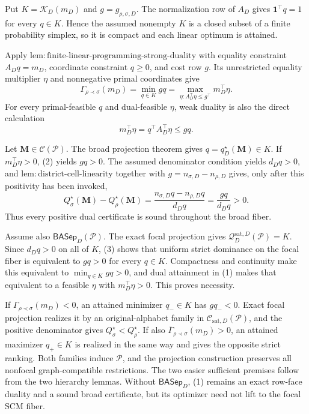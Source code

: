 Put \(K=\mathcal K_D(m_D)\) and \(g=g_{\rho,\sigma,D}\).  The normalization row of \(A_D\) gives \(\mathbf 1^\top q=1\) for every \(q\in K\).  Hence the assumed nonempty \(K\) is a closed subset of a finite probability simplex, so it is compact and each linear optimum is attained.

Apply \(\mathrm{lem:finite\text{-}linear\text{-}programming\text{-}strong\text{-}duality}\) with equality constraint \(A_Dq=m_D\), coordinate constraint \(q\geq0\), and cost row \(g\).  Its unrestricted equality multiplier \(\eta\) and nonnegative primal coordinates give
\[
\Gamma_{\rho\prec\sigma}(m_D)
=\min_{q\in K}gq
=\max_{\eta:A_D^\top\eta\le g^\top}m_D^\top\eta.
\tag{1}
\]
For every primal-feasible \(q\) and dual-feasible \(\eta\), weak duality is also the direct calculation
\[
m_D^\top\eta=q^\top A_D^\top\eta\le gq.
\tag{2}
\]

Let \(\mathbf M\in\mathcal C(\mathcal P)\).  The broad projection theorem gives \(q=q_D^\star(\mathbf M)\in K\).  If \(m_D^\top\eta>0\), (2) yields \(gq>0\).  The assumed denominator condition yields \(d_Dq>0\), and \(\mathrm{lem:district\text{-}cell\text{-}linearity}\) together with \(g=n_{\sigma,D}-n_{\rho,D}\) gives, only after this positivity has been invoked,
\[
Q_\sigma^\star(\mathbf M)-Q_\rho^\star(\mathbf M)
=\frac{n_{\sigma,D}q-n_{\rho,D}q}{d_Dq}
=\frac{gq}{d_Dq}>0.
\tag{3}
\]
Thus every positive dual certificate is sound throughout the broad fiber.

Assume also \(\mathsf{BASep}_D(\mathcal P)\).  The exact focal projection gives \(\mathcal Q_D^{\mathrm{sat},D}(\mathcal P)=K\).  Since \(d_Dq>0\) on all of \(K\), (3) shows that uniform strict dominance on the focal fiber is equivalent to \(gq>0\) for every \(q\in K\).  Compactness and continuity make this equivalent to \(\min_{q\in K}gq>0\), and dual attainment in (1) makes that equivalent to a feasible \(\eta\) with \(m_D^\top\eta>0\).  This proves necessity.

If \(\Gamma_{\rho\prec\sigma}(m_D)<0\), an attained minimizer \(q_-\in K\) has \(gq_-<0\).  Exact focal projection realizes it by an original-alphabet family in \(\mathcal C_{\mathrm{sat},D}(\mathcal P)\), and the positive denominator gives \(Q_\sigma^\star<Q_\rho^\star\).  If also \(\overline\Gamma_{\rho\prec\sigma}(m_D)>0\), an attained maximizer \(q_+\in K\) is realized in the same way and gives the opposite strict ranking.  Both families induce \(\mathcal P\), and the projection construction preserves all nonfocal graph-compatible restrictions.  The two easier sufficient premises follow from the two hierarchy lemmas.  Without \(\mathsf{BASep}_D\), (1) remains an exact row-face duality and a sound broad certificate, but its optimizer need not lift to the focal SCM fiber.